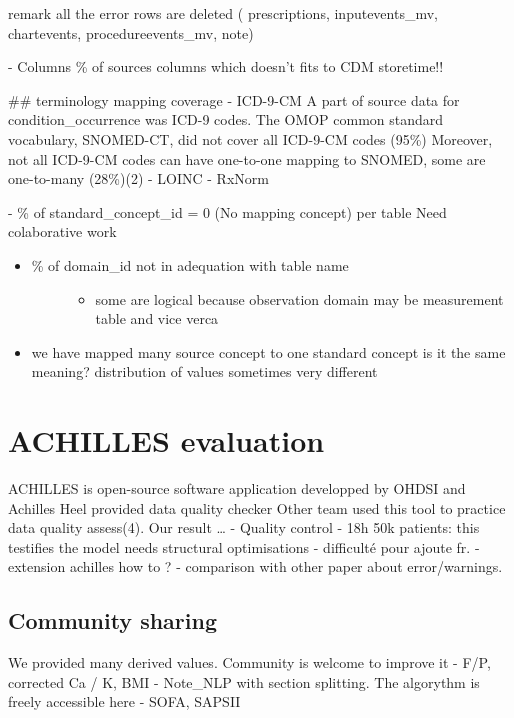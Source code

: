 remark all the error rows are deleted ( prescriptions, inputevents\_mv,
chartevents, procedureevents\_mv, note)

- Columns \% of sources columns which doesn't fits to CDM storetime!!

\#\# terminology mapping coverage - ICD-9-CM A part of source data for
condition\_occurrence was ICD-9 codes. The OMOP common standard
vocabulary, SNOMED-CT, did not cover all ICD-9-CM codes (95\%) Moreover,
not all ICD-9-CM codes can have one-to-one mapping to SNOMED, some are
one-to-many (28\%)(2) - LOINC - RxNorm

- \% of standard\_concept\_id = 0 (No mapping concept) per table Need
colaborative work

\begin{itemize}
\item
  \begin{description}
  \item[\% of domain\_id not in adequation with table name]
  \begin{itemize}
  \tightlist
  \item
    some are logical because observation domain may be measurement table
    and vice verca
  \end{itemize}
  \end{description}
\item
  we have mapped many source concept to one standard concept is it the
  same meaning? distribution of values sometimes very different
\end{itemize}

\section{ACHILLES evaluation}\label{achilles-evaluation}

ACHILLES is open-source software application developped by OHDSI and
Achilles Heel provided data quality checker Other team used this tool to
practice data quality assess(4). Our result \ldots{} - Quality control -
18h 50k patients: this testifies the model needs structural
optimisations - difficulté pour ajoute fr. - extension achilles how to ?
- comparison with other paper about error/warnings.

\subsection{Community sharing}\label{community-sharing}

We provided many derived values. Community is welcome to improve it -
F/P, corrected Ca / K, BMI - Note\_NLP with section splitting. The
algorythm is freely accessible here - SOFA, SAPSII

